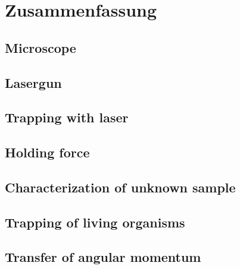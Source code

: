 \documentclass[12pt,english,ngerman]{scrartcl}
\begin{document}
\section{Zusammenfassung}\label{sec:zusammenfassung}

\subsection{Microscope}

\subsection{Lasergun}

\subsection{Trapping with laser}

\subsection{Holding force}

\subsection{Characterization of unknown sample}

\subsection{Trapping of living organisms}

\subsection{Transfer of angular momentum}

\newpage
\printbibliography
\listoffigures
\listoftables
\end{document}
